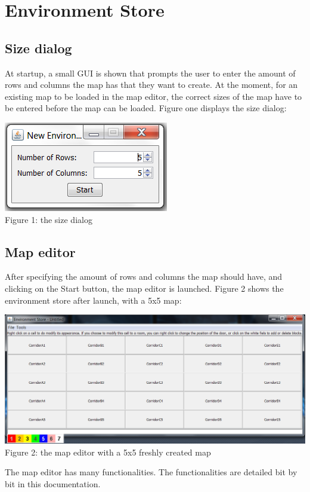 \section{Environment Store}
\subsection{Size dialog}
At startup, a small GUI is shown that prompts the user to enter the amount of rows and columns the map has that they want to create. At the moment, for an existing map to be loaded in the map editor, the correct sizes of the map have to be entered before the map can be loaded. Figure one displays the size dialog:
\begin{center}
	\centering
	\includegraphics{SizeDialog.png}\\
	Figure 1: the size dialog
\end{center}
\subsection{Map editor}
After specifying the amount of rows and columns the map should have, and clicking on the Start button, the map editor is launched. Figure 2 shows the environment store after launch, with a 5x5 map:
\begin{center}
	\centering
	\includegraphics[scale=0.55]{MapEditor.png}\\
	Figure 2: the map editor with a 5x5 freshly created map
\end{center}
The map editor has many functionalities. The functionalities are detailed bit by bit in this documentation.

